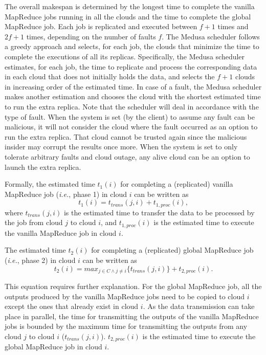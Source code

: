 \documentclass[10pt, conference, compsocconf]{IEEEtran}
\begin{document}
The overall makespan is determined by the longest time to complete the vanilla MapReduce jobs running in all the clouds and the time to complete the global MapReduce job.
Each job is replicated and executed between $f+1$ times and $2f+1$ times, depending on the number of faults $f$. The Medusa scheduler follows a greedy approach and selects, for each job, the clouds that minimize the time to complete the executions of all its replicas. Specifically, the Medusa scheduler estimates, for each job, the time to replicate and process the corresponding data in each cloud that does not initially holds the data, and selects the $f+1$ clouds in increasing order of the estimated time. In case of a fault, the Medusa scheduler makes another estimation and chooses the cloud with the shortest estimated time to run the extra replica.
Note that the scheduler will deal in accordance with the type of fault.
When the system is set (by the client) to assume any fault can be malicious, it will not consider the cloud where the fault occurred as an option to run the extra replica.
That cloud cannot be trusted again since the malicious insider may corrupt the results once more.
When the system is set to only tolerate arbitrary faults and cloud outage, any alive cloud can be an option to launch the extra replica.

Formally, the estimated time $t_1(i)$ for completing a (replicated) vanilla MapReduce job (\textit{i.e.}, phase 1) in cloud $i$ can be written as
\begin{equation}
    \label{eq:time:eq1}
    t_1(i) = t_{trans}(j, i) + t_{1, proc}(i),
\end{equation}
where $t_{trans}(j, i)$ is the estimated time to transfer the data to be processed by the job from cloud $j$ to cloud $i$, and $t_{1, proc}(i)$ is the estimated time to execute the vanilla MapReduce job in cloud $i$.

The estimated time $t_2(i)$ for completing a (replicated) global MapReduce job (\textit{i.e.}, phase 2) in cloud $i$ can be written as
\begin{equation}
    \label{eq:time:eq2}
    t_2(i) = max_{j\in C\wedge j\neq i}\{t_{trans}(j, i)\} + t_{2, proc}(i).
\end{equation}

This equation requires further explanation. For the global MapReduce job, all the outputs produced by the vanilla MapReduce jobs need to be copied to cloud $i$ except the ones that already exist in cloud $i$. As the data transmission can take place in parallel, the time for transmitting the outputs of the vanilla MapReduce jobs is bounded by the maximum time for transmitting the outputs from any cloud $j$ to cloud $i$ ($t_{trans}(j, i)$). $t_{2, proc}(i)$ is the estimated time to execute the global MapReduce job in cloud $i$.
\end{document}
